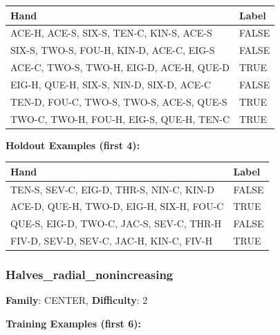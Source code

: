 \documentclass[10pt,a4paper]{article}
\begin{document}
\begin{small}
\begin{tabular}{p{8cm}l}
\toprule
Hand & Label \\
\midrule
ACE-H, ACE-S, SIX-S, TEN-C, KIN-S, ACE-S & \textcolor{negative}{FALSE} \\
SIX-S, TWO-S, FOU-H, KIN-D, ACE-C, EIG-S & \textcolor{negative}{FALSE} \\
ACE-C, TWO-S, TWO-H, EIG-D, ACE-H, QUE-D & \textcolor{positive}{TRUE} \\
EIG-H, QUE-H, SIX-S, NIN-D, SIX-D, ACE-C & \textcolor{negative}{FALSE} \\
TEN-D, FOU-C, TWO-S, TWO-S, ACE-S, QUE-S & \textcolor{positive}{TRUE} \\
TWO-C, TWO-H, FOU-H, EIG-S, QUE-H, TEN-C & \textcolor{positive}{TRUE} \\
\bottomrule
\end{tabular}
\end{small}

\textbf{Holdout Examples (first 4):}

\begin{small}
\begin{tabular}{p{8cm}l}
\toprule
Hand & Label \\
\midrule
TEN-S, SEV-C, EIG-D, THR-S, NIN-C, KIN-D & \textcolor{negative}{FALSE} \\
ACE-D, QUE-H, TWO-D, EIG-H, SIX-H, FOU-C & \textcolor{positive}{TRUE} \\
QUE-S, EIG-D, TWO-C, JAC-S, SEV-C, THR-H & \textcolor{negative}{FALSE} \\
FIV-D, SEV-D, SEV-C, JAC-H, KIN-C, FIV-H & \textcolor{positive}{TRUE} \\
\bottomrule
\end{tabular}
\end{small}

\vspace{0.5cm}

\subsubsection{Halves\_radial\_nonincreasing}

\textbf{Family}: CENTER, \textbf{Difficulty}: 2

\textbf{Training Examples (first 6):}
\end{document}
